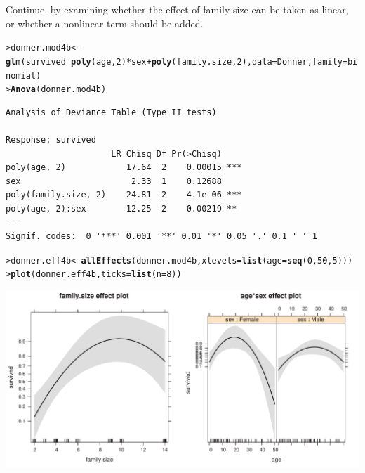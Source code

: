 \documentclass[10pt]{report}\usepackage[]{graphicx}\usepackage[]{color}
\makeatletter
\newcommand{\hlnum}[1]{\textcolor[rgb]{0.686,0.059,0.569}{#1}}%
\newcommand{\hlopt}[1]{\textcolor[rgb]{0,0,0}{#1}}%
\newcommand{\hlstd}[1]{\textcolor[rgb]{0.345,0.345,0.345}{#1}}%
\newcommand{\hlkwb}[1]{\textcolor[rgb]{0.69,0.353,0.396}{#1}}%
\newcommand{\hlkwc}[1]{\textcolor[rgb]{0.333,0.667,0.333}{#1}}%
\newcommand{\hlkwd}[1]{\textcolor[rgb]{0.737,0.353,0.396}{\textbf{#1}}}%
\newenvironment{kframe}{%
 \def\at@end@of@kframe{}%
 \ifinner\ifhmode%
  \def\at@end@of@kframe{\end{minipage}}%
  \begin{minipage}{\columnwidth}%
 \fi\fi%
 \def\FrameCommand##1{\hskip\@totalleftmargin \hskip-\fboxsep
 \colorbox{shadecolor}{##1}\hskip-\fboxsep
     \hskip-\linewidth \hskip-\@totalleftmargin \hskip\columnwidth}%
 \MakeFramed {\advance\hsize-\width
   \@totalleftmargin\z@ \linewidth\hsize
   \@setminipage}}%
 {\par\unskip\endMakeFramed%
 \at@end@of@kframe}
\newenvironment{knitrout}{}{} %
\renewenvironment{knitrout}{\small\renewcommand{\baselinestretch}{.85}}{} %
\makeatother
\begin{document}
\begin{Exercises}
\begin{enumerate*}
    \item Continue, by examining whether the effect of family size
    can be taken as linear, or whether a nonlinear term should be
    added.
    \begin{ans}
\begin{knitrout}\footnotesize
{}\color{fgcolor}\begin{kframe}
\begin{alltt}
\hlstd{> }\hlstd{donner.mod4b} \hlkwb{<-} \hlkwd{glm}\hlstd{(survived} \hlopt{~} \hlkwd{poly}\hlstd{(age,}\hlnum{2}\hlstd{)} \hlopt{*} \hlstd{sex} \hlopt{+} \hlkwd{poly}\hlstd{(family.size,} \hlnum{2}\hlstd{),} \hlkwc{data}\hlstd{=Donner,} \hlkwc{family}\hlstd{=binomial)}
\hlstd{> }\hlkwd{Anova}\hlstd{(donner.mod4b)}
\end{alltt}
\begin{verbatim}
Analysis of Deviance Table (Type II tests)

Response: survived
                     LR Chisq Df Pr(>Chisq)    
poly(age, 2)            17.64  2    0.00015 ***
sex                      2.33  1    0.12688    
poly(family.size, 2)    24.81  2    4.1e-06 ***
poly(age, 2):sex        12.25  2    0.00219 ** 
---
Signif. codes:  0 '***' 0.001 '**' 0.01 '*' 0.05 '.' 0.1 ' ' 1
\end{verbatim}
\begin{alltt}
\hlstd{> }\hlstd{donner.eff4b} \hlkwb{<-} \hlkwd{allEffects}\hlstd{(donner.mod4b,} \hlkwc{xlevels}\hlstd{=}\hlkwd{list}\hlstd{(}\hlkwc{age}\hlstd{=}\hlkwd{seq}\hlstd{(}\hlnum{0}\hlstd{,}\hlnum{50}\hlstd{,}\hlnum{5}\hlstd{)))}
\hlstd{> }\hlkwd{plot}\hlstd{(donner.eff4b,} \hlkwc{ticks}\hlstd{=}\hlkwd{list}\hlstd{(}\hlkwc{n}\hlstd{=}\hlnum{8}\hlstd{))}
\end{alltt}
\end{kframe}

\centerline{\includegraphics[width=.5\textwidth]{soln/fig/ex7_4c-1} }



\end{knitrout}
    \end{ans}
    

\end{enumerate*}
\end{Exercises}
\end{document}
